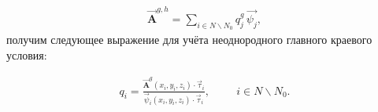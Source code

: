 \begin{equation*} \label{eq_1_19}
	\begin{gathered}
		\overrightarrow{\textbf{A}}^{g,h} = \sum \limits_{i \in N \backslash N_0} q_j^g \, \overrightarrow{\psi_j},
	\end{gathered}
\end{equation*}
получим следующее выражение для учёта неоднородного главного краевого условия:

\begin{equation*} \label{eq_1_20}
	\begin{gathered}
		q_i = \frac{\overrightarrow{\textbf{A}}^g \left(x_i, y_i, z_i\right) \cdot \overrightarrow{\tau}_i}{\overrightarrow{\psi}_i \left(x_i, y_i, z_i\right) \cdot \overrightarrow{\tau}_i}, \hspace{1cm} i \in N \backslash N_0.
	\end{gathered}
\end{equation*}


